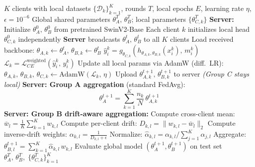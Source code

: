 \documentclass[utf8]{FrontiersinHarvard} %
\newcommand{\sadrift}{FedSA-Drift}
\begin{document}
\begin{algorithm}[t]
\caption{\sadrift{}: Structure-Aware Federated Training with Drift-Aware Aggregation}
\label{alg:federated}
\begin{algorithmic}[1]
\REQUIRE $K$ clients with local datasets $\{\mathcal{D}_k\}_{k=1}^K$, rounds $T$, local epochs $E$, learning rate $\eta$, $\epsilon = 10^{-6}$
\ENSURE Global shared parameters $\theta_A^T,\, \theta_B^T$; local parameters $\{\theta_{C,k}^T\}$
\STATE \textbf{Server:} Initialize $\theta_A^0,\, \theta_B^0$ from pretrained SwinV2-Base
\STATE Each client $k$ initializes local head $\theta_{C,k}^0$ independently
    \STATE \textbf{Server} broadcasts $\theta_A^t,\, \theta_B^t$ to all $K$ clients
        \STATE Load received backbone: $\theta_{A,k} \leftarrow \theta_A^t$,\; $\theta_{B,k} \leftarrow \theta_B^t$
                \STATE $\hat{y}_i^k = g_{\theta_{C,k}}\!\left(h_{\theta_{A,k},\theta_{B,k}}(x_i^k),\, m_i^k\right)$
                \STATE $\mathcal{L}_k = \mathcal{L}_{CE}^{\text{weighted}}(\hat{y}_i^k,\, y_i^k)$
                \STATE Update all local params via AdamW (diff.\ LR):
                       $\theta_{A,k},\, \theta_{B,k},\, \theta_{C,k} \leftarrow \text{AdamW}(\mathcal{L}_k,\,\eta)$
            \ENDFOR
        \ENDFOR
        \STATE Upload $\theta_{A,k}^{t+1},\, \theta_{B,k}^{t+1}$ to server \quad \textit{(Group C stays local)}
    \ENDFOR
    \STATE \textbf{Server: Group A aggregation} (standard FedAvg):
           \[ \theta_A^{t+1} = \sum_{k=1}^{K} \frac{n_k}{N}\, \theta_{A,k}^{t+1} \]
    \STATE \textbf{Server: Group B drift-aware aggregation:}
        \STATE Compute cross-client mean:
               $\bar{w}_l = \frac{1}{K}\sum_{k=1}^{K} w_{k,l}$
        \STATE Compute per-client drift:
               $D_{k,l} = \|w_{k,l} - \bar{w}_l\|_2$
        \STATE Compute inverse-drift weights:
               $\alpha_{k,l} = \frac{1}{D_{k,l} + \epsilon}$
        \STATE Normalize:
               $\hat{\alpha}_{k,l} = \alpha_{k,l} \big/ \sum_{j=1}^{K} \alpha_{j,l}$
        \STATE Aggregate:
               $\theta_{B,l}^{t+1} = \sum_{k=1}^{K} \hat{\alpha}_{k,l}\, w_{k,l}$
    \ENDFOR
    \STATE Evaluate global model $(\theta_A^{t+1}, \theta_B^{t+1})$ on test set
\ENDFOR
\RETURN $\theta_A^T,\, \theta_B^T,\; \{\theta_{C,k}^T\}_{k=1}^K$
\end{algorithmic}
\end{algorithm}
\end{document}
